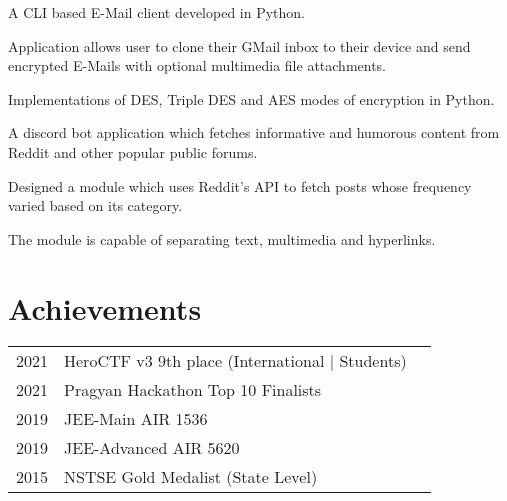 \documentclass[]{deedy-resume-openfont}
\begin{document}
\begin{minipage}[t]{0.66\textwidth}
\begin{tightemize}
\item A CLI based E-Mail client developed in Python.
\item Application allows user to clone their GMail inbox to their device and send encrypted E-Mails with optional multimedia file attachments.
\end{tightemize}
\sectionsep

\begin{tightemize}
\item Implementations of DES, Triple DES and AES modes of encryption in Python.
\end{tightemize}
\sectionsep

\begin{tightemize}
\item A discord bot application which fetches informative and humorous content from Reddit and other popular public forums.
\item Designed a module which uses Reddit's API to fetch posts whose frequency varied based on its category.
\item The module is capable of separating text, multimedia and hyperlinks.
\end{tightemize}
\sectionsep


\section{Achievements} 
\begin{tabular}{rll}
2021         & HeroCTF v3 9th place (International | Students) \\
2021         & Pragyan Hackathon Top 10 Finalists \\
2019	     & JEE-Main AIR 1536 \\
2019	     & JEE-Advanced AIR 5620 \\
2015	     & NSTSE Gold Medalist (State Level)\\
\end{tabular}
\sectionsep

\end{minipage} 
\end{document}
